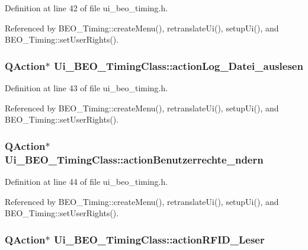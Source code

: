 Definition at line 42 of file ui\_\-beo\_\-timing.h.

Referenced by BEO\_\-Timing::createMenu(), retranslateUi(), setupUi(), and BEO\_\-Timing::setUserRights().\hypertarget{class_ui___b_e_o___timing_class_19d90e63709c1a938c5fef1a889775ac}{
\subsubsection[actionLog\_\-Datei\_\-auslesen]{\setlength{\rightskip}{0pt plus 5cm}QAction$\ast$ {\bf Ui\_\-BEO\_\-TimingClass::actionLog\_\-Datei\_\-auslesen}}}
\label{class_ui___b_e_o___timing_class_19d90e63709c1a938c5fef1a889775ac}




Definition at line 43 of file ui\_\-beo\_\-timing.h.

Referenced by BEO\_\-Timing::createMenu(), retranslateUi(), setupUi(), and BEO\_\-Timing::setUserRights().\hypertarget{class_ui___b_e_o___timing_class_94c7159e426b9ebbafe93728014bd305}{
\subsubsection[actionBenutzerrechte\_\-ndern]{\setlength{\rightskip}{0pt plus 5cm}QAction$\ast$ {\bf Ui\_\-BEO\_\-TimingClass::actionBenutzerrechte\_\-ndern}}}
\label{class_ui___b_e_o___timing_class_94c7159e426b9ebbafe93728014bd305}




Definition at line 44 of file ui\_\-beo\_\-timing.h.

Referenced by BEO\_\-Timing::createMenu(), retranslateUi(), setupUi(), and BEO\_\-Timing::setUserRights().\hypertarget{class_ui___b_e_o___timing_class_d5ff0108e29b7b18abdcd64e61b6828a}{
\subsubsection[actionRFID\_\-Leser]{\setlength{\rightskip}{0pt plus 5cm}QAction$\ast$ {\bf Ui\_\-BEO\_\-TimingClass::actionRFID\_\-Leser}}}
\label{class_ui___b_e_o___timing_class_d5ff0108e29b7b18abdcd64e61b6828a}




